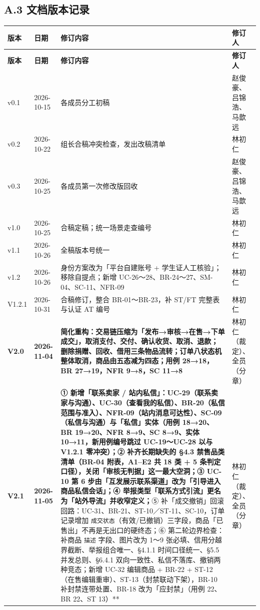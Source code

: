 \documentclass[12pt,a4paper]{ctexart}
\begin{document}
\subsection*{A.3 文档版本记录}

{\scriptsize
\begin{longtable}{|p{1.33cm}|p{1.33cm}|p{12.01cm}|p{1.33cm}|}
\hline
\textbf{版本} & \textbf{日期} & \textbf{修订内容} & \textbf{修订人} \\
\hline
\endfirsthead
\hline
\textbf{版本} & \textbf{日期} & \textbf{修订内容} & \textbf{修订人} \\
\hline
\endhead
\hline
\endfoot
v0.1 & 2026-10-15 & 各成员分工初稿 & 赵俊豪、吕锦浩、马歆远 \\
\hline
v0.2 & 2026-10-22 & 组长合稿冲突检查，发出改稿清单 & 林初仁 \\
\hline
v0.3 & 2026-10-25 & 各成员第一次修改版回收 & 赵俊豪、吕锦浩、马歆远 \\
\hline
v1.0 & 2026-10-25 & 合稿定稿；统一场景走查编号 & 林初仁 \\
\hline
v1.1 & 2026-10-26 & 全稿版本号统一 & 林初仁 \\
\hline
v1.2 & 2026-10-26 & 身份方案改为「平台自建账号 + 学生证人工核验」；移除自提点；新增 UC-26～28、BR-24～27、SM-04、SC-11、NFR-09 & 林初仁 \\
\hline
V1.2.1 & 2026-10-31 & 合稿修订，整合 BR-01～BR-23，补 ST/FT 完整表与认证 AT 编号 & 林初仁 \\
\hline
\textbf{V2.0} & \textbf{2026-11-04} & \textbf{简化重构：交易链压缩为「发布→审核→在售→下单成交」，取消支付、交付、确认收货、取消、退款；删除捐赠、回收、借用三条物品流转；订单八状态机整体取消，商品由五态减为四态；用例 28→18，BR 27→19，NFR 9→8，SC 11→8} & 林初仁（裁定）、全员（分章） \\
\hline
\textbf{V2.1} & \textbf{2026-11-05} & \textbf{① 新增「联系卖家 / 站内私信」：UC-29（联系卖家与沟通）、UC-30（查看我的私信）、BR-20（私信范围与准入）、NFR-09（站内消息可达性）、SC-09（私信与沟通）与「私信」实体（用例 18→20、BR 19→20、NFR 8→9、SC 8→9、实体 10→11，新用例编号跳过 UC-19～UC-28 以与 V1.2.1 零冲突）；② 补齐长期缺失的 §4.3 禁售品类清单（BR-04 附表，A1–E2 共 18 类 + 5 条判定口径），关闭「审核无判据」这一最大空洞；③ UC-10 第 6 步由「互发展示联系渠道」改为「引导进入商品私信会话」；④ 举报类型「联系方式引流」更名为「站外导流」并收窄定义；}⑤ 补「成交撤销」回滚回路：UC-31、BR-21、ST-10／ST-11、SC-10，订单记录增加 \texttt{成交状态}（有效/已撤销）三字段，商品「已售出」不再是无出口的硬终态；⑥ 第二轮边界检查：补商品 \texttt{描述} 字段、图片改为 1～9 张必填、信用分越界截断、举报组合唯一、§4.1.1 时间口径统一、§5.5 并发总则、§6.4.1 双向一致性、私信不落库、撤销两种竞态；新增 UC-32 编辑商品 + BR-22 + ST-12（在售编辑重审）、ST-13（封禁联动下架），BR-10 补封禁连带处置、BR-18 改为「应封禁」（用例 22、BR 22、ST 13）** & 林初仁（裁定）、全员（分章） \\
\hline
\end{longtable}
}
\end{document}
